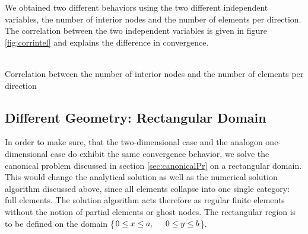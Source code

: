 \documentclass[a4paper,12pt]{article}
\makeatletter
\newenvironment{figurehere}
  {\def\@captype{figure}}
  {}
\makeatother
\begin{document}
We obtained two different behaviors using the two different independent variables, the number of interior nodes and the number of elements per direction. The correlation between the two independent variables is given in figure \ref{fig:corrintel} and explains the difference in convergence.
\begin{center}
\begin{figurehere}
\\
\caption{Correlation between the number of interior nodes and the number of elements per direction}\label{fig:corrintel}
\end{figurehere}
\end{center}
\subsection{Different Geometry: Rectangular Domain}
In order to make sure, that the two-dimensional case and the analogon one-dimensional case do exhibit the same convergence behavior, we solve the canonical problem discussed in section \ref{sec:canonicalPr} on a rectangular domain. This would change the analytical solution as well as the numerical solution algorithm discussed above, since all elements collapse into one single category: full elements. The solution algorithm acts therefore as regular finite elements without the notion of partial elements or ghost nodes. 
The rectangular region is to be defined on the domain \{$0\leq x \leq a,\hspace{0.5cm}0\leq y \leq b$\}.
\end{document}
